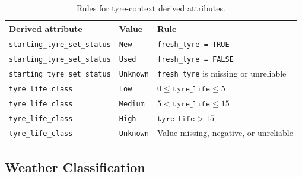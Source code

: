 \documentclass[11pt,a4paper]{article}
\begin{document}
	\begin{table}[H]
		\centering
		\caption{Rules for tyre-context derived attributes.}
		\begin{tabularx}{\linewidth}{p{5.5cm}p{4cm}X}
			\toprule
			\textbf{Derived attribute}
			& \textbf{Value}
			& \textbf{Rule} \\
			\midrule
			
			\texttt{starting\_tyre\_set\_status}
			& \texttt{New}
			& \texttt{fresh\_tyre = TRUE} \\
			
			\texttt{starting\_tyre\_set\_status}
			& \texttt{Used}
			& \texttt{fresh\_tyre = FALSE} \\
			
			\texttt{starting\_tyre\_set\_status}
			& \texttt{Unknown}
			& \texttt{fresh\_tyre} is missing or unreliable \\
			
			\midrule
			
			\texttt{tyre\_life\_class}
			& \texttt{Low}
			& $0 \leq \texttt{tyre\_life} \leq 5$ \\
			
			\texttt{tyre\_life\_class}
			& \texttt{Medium}
			& $5 < \texttt{tyre\_life} \leq 15$ \\
			
			\texttt{tyre\_life\_class}
			& \texttt{High}
			& $\texttt{tyre\_life} > 15$ \\
			
			\texttt{tyre\_life\_class}
			& \texttt{Unknown}
			& Value missing, negative, or unreliable \\
			
			\bottomrule
		\end{tabularx}
	\end{table}
	
	\subsection{Weather Classification}
	
\end{document}
